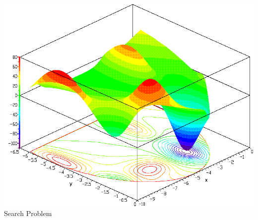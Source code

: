 \documentclass[10pt, compress, aspectratio=169]{beamer}
\begin{document}
\begin{frame}
\begin{columns}
            \begin{block}{}
                \begin{center}
                    \includegraphics[width=\columnwidth]{sample_search_space}
                    \alert{Search Problem}
                \end{center}
            \end{block}

    \end{columns}
\end{frame}
\end{document}
